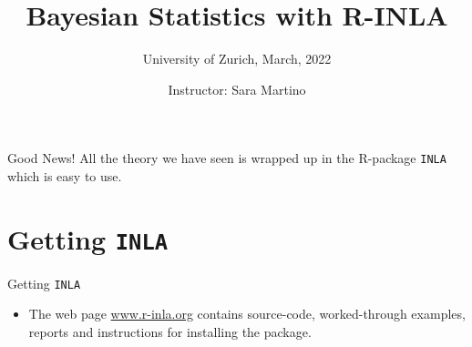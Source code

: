 \documentclass[
  handout]{beamer}
\title{Bayesian Statistics with R-INLA}
\subtitle{University of Zurich, March, 2022}
\author{Instructor: Sara Martino}
\date{}
\institute{Department of Mathematical Science (NTNU)}
\providecommand{\tightlist}{%
  \setlength{\itemsep}{0pt}\setlength{\parskip}{0pt}}
\begin{document}
\frame{\titlepage}

\begin{frame}[allowframebreaks]
  \tableofcontents[hideallsubsections]
\end{frame}
\begin{frame}
\end{frame}

\begin{frame}[fragile]{Good News!}
\protect\hypertarget{good-news}{}
\hfill\break
\hfill\break
\centering All the theory we have seen is wrapped up in the R-package
\texttt{INLA} which is easy to use.
\end{frame}

\hypertarget{getting-inla}{%
\section{\texorpdfstring{Getting
\texttt{INLA}}{Getting INLA}}\label{getting-inla}}

\begin{frame}{Getting \texttt{INLA}}
\protect\hypertarget{getting-inla-1}{}
\begin{itemize}
\tightlist
\item
  The web page \textcolor{red}{\url{www.r-inla.org}} contains
  source-code, worked-through examples, reports and instructions for
  installing the package.
\end{itemize}
\end{frame}
\end{document}
